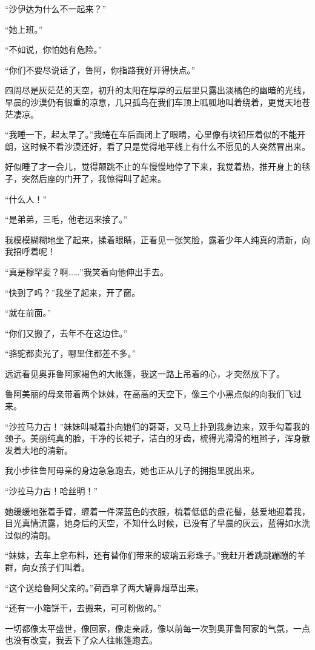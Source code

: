 \par “沙伊达为什么不一起来？”
\par “她上班。”
\par “不如说，你怕她有危险。”
\par “你们不要尽说话了，鲁阿，你指路我好开得快点。”
\par 四周尽是灰茫茫的天空，初升的太阳在厚厚的云层里只露出淡橘色的幽暗的光线，早晨的沙漠仍有很重的凉意，几只孤鸟在我们车顶上呱呱地叫着绕着，更觉天地苍茫凄凉。
\par “我睡一下，起太早了。”我蜷在车后面闭上了眼睛，心里像有块铅压着似的不能开朗，这时候不看沙漠还好，看了只是觉得地平线上有什么不愿见的人突然冒出来。
\par 好似睡了才一会儿，觉得颠跳不止的车慢慢地停了下来，我觉着热，推开身上的毯子，突然后座的门开了，我惊得叫了起来。
\par “什么人！”
\par “是弟弟，三毛，他老远来接了。”
\par 我模模糊糊地坐了起来，揉着眼睛，正看见一张笑脸，露着少年人纯真的清新，向我招呼着呢！
\par “真是穆罕麦？啊……”我笑着向他伸出手去。
\par “快到了吗？”我坐了起来，开了窗。
\par “就在前面。”
\par “你们又搬了，去年不在这边住。”
\par “骆驼都卖光了，哪里住都差不多。”
\par 远远看见奥菲鲁阿家褐色的大帐篷，我这一路上吊着的心，才突然放下了。
\par 鲁阿美丽的母亲带着两个妹妹，在高高的天空下，像三个小黑点似的向我们飞过来。
\par “沙拉马力古！”妹妹叫喊着扑向她们的哥哥，又马上扑到我身边来，双手勾着我的颈子。美丽纯真的脸，干净的长裙子，洁白的牙齿，梳得光滑滑的粗辫子，浑身散发着大地的清新。
\par 我小步往鲁阿母亲的身边急急跑去，她也正从儿子的拥抱里脱出来。
\par “沙拉马力古！哈丝明！”
\par 她缓缓地张着手臂，缠着一件深蓝色的衣服，梳着低低的盘花髻，慈爱地迎着我，目光真情流露，她身后的天空，不知什么时候，已没有了早晨的灰云，蓝得如水洗过似的清朗。
\par “妹妹，去车上拿布料，还有替你们带来的玻璃五彩珠子。”我赶开着跳跳蹦蹦的羊群，向女孩子们叫着。
\par “这个送给鲁阿父亲的。”荷西拿了两大罐鼻烟草出来。
\par “还有一小箱饼干，去搬来，可可粉做的。”
\par 一切都像太平盛世，像回家，像走亲戚，像以前每一次到奥菲鲁阿家的气氛，一点也没有改变，我丢下了众人往帐篷跑去。
